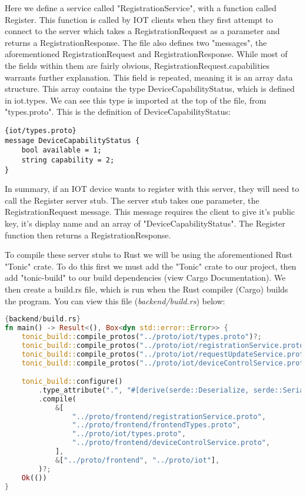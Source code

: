Here we define a service called "RegistrationService", with a function called Register. This function is called by IOT clients when they first attempt to connect to the server which takes a RegistrationRequest as a parameter and returns a RegistrationResponse. The file also defines two "messages", the aforementioned RegistrationRequest and RegistrationResponse. While most of the fields within them are fairly obvious, RegistrationRequest.capabilities warrants further explanation.
    This field is repeated, meaning it is an array data structure. This array contains the type DeviceCapabilityStatus, which is defined in iot.types. We can see this type is imported at the top of the file, from "types.proto". This is the definition of DeviceCapabilityStatus:

\begin{lstlisting}[language=protobuf3, style=boxed]{iot/types.proto}
message DeviceCapabilityStatus {
    bool available = 1;
    string capability = 2;
}
\end{lstlisting}

In summary, if an IOT device wants to register with this server, they will need to call the Register server stub. The server stub takes one parameter, the RegistrationRequest message. This message requires the client to give it's public key, it's display name and an array of "DeviceCapabilityStatus". The Register function then returns a RegistrationResponse. 

To compile these server stubs to Rust we will be using the aforementioned Rust "Tonic" crate. To do this first we must add the "Tonic" crate to our project, then add "tonic-build" to our build dependencies (view Cargo Documentation). We then create a build.rs file, which is run when the Rust compiler (Cargo) builds the program. You can view this file (\textit{backend/build.rs}) below:

\begin{lstlisting}[language=Rust, style=boxed, showstringspaces=false]{backend/build.rs}
fn main() -> Result<(), Box<dyn std::error::Error>> {
    tonic_build::compile_protos("../proto/iot/types.proto")?;
    tonic_build::compile_protos("../proto/iot/registrationService.proto")?;
    tonic_build::compile_protos("../proto/iot/requestUpdateService.proto")?;
    tonic_build::compile_protos("../proto/iot/deviceControlService.proto")?;

    tonic_build::configure()
        .type_attribute(".", "#[derive(serde::Deserialize, serde::Serialize)]")
        .compile(
            &[
                "../proto/frontend/registrationService.proto",
                "../proto/frontend/frontendTypes.proto",
                "../proto/iot/types.proto",
                "../proto/frontend/deviceControlService.proto",
            ],
            &["../proto/frontend", "../proto/iot"],
        )?;
    Ok(())
}
\end{lstlisting}

